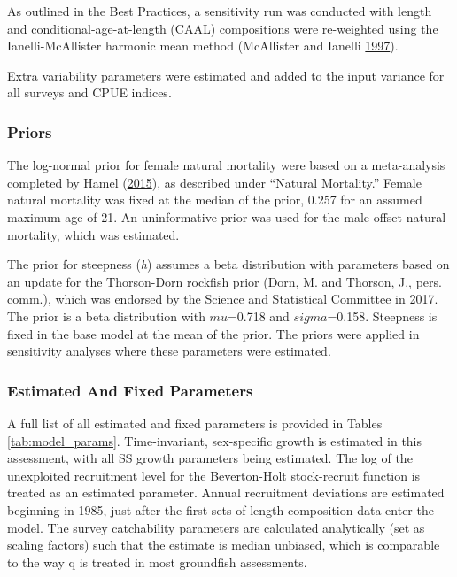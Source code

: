 \documentclass[12pt,]{article}
\begin{document}
As outlined in the Best Practices, a sensitivity run was conducted with
length and conditional-age-at-length (CAAL) compositions were
re-weighted using the Ianelli-McAllister harmonic mean method
(McAllister and Ianelli \protect\hyperlink{ref-McAllister1997}{1997}).

Extra variability parameters were estimated and added to the input
variance for all surveys and CPUE indices.

\subsubsection{Priors}\label{priors}

The log-normal prior for female natural mortality were based on a
meta-analysis completed by Hamel
(\protect\hyperlink{ref-Hamel2015}{2015}), as described under ``Natural
Mortality.'' Female natural mortality was fixed at the median of the
prior, 0.257 for an assumed maximum age of 21. An uninformative prior
was used for the male offset natural mortality, which was estimated.

The prior for steepness (\emph{h}) assumes a beta distribution with
parameters based on an update for the Thorson-Dorn rockfish prior (Dorn,
M. and Thorson, J., pers. comm.), which was endorsed by the Science and
Statistical Committee in 2017. The prior is a beta distribution with
\(mu\)=0.718 and \(sigma\)=0.158. Steepness is fixed in the base model
at the mean of the prior. The priors were applied in sensitivity
analyses where these parameters were estimated.

\subsubsection{Estimated And Fixed
Parameters}\label{estimated-and-fixed-parameters}

A full list of all estimated and fixed parameters is provided in Tables
\ref{tab:model_params}. Time-invariant, sex-specific growth is estimated
in this assessment, with all SS growth parameters being estimated. The
log of the unexploited recruitment level for the Beverton-Holt
stock-recruit function is treated as an estimated parameter. Annual
recruitment deviations are estimated beginning in 1985, just after the
first sets of length composition data enter the model. The survey
catchability parameters are calculated analytically (set as scaling
factors) such that the estimate is median unbiased, which is comparable
to the way q is treated in most groundfish assessments.
\end{document}

